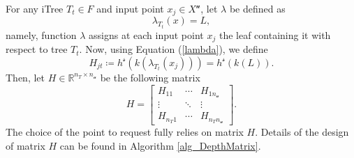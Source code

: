 For any iTree $T_t \in F$ and input point $x_j \in X^\mathcal{u}$, let $\lambda$ be defined as
\begin{equation}
    \lambda_{T_t}(x) = L, \label{lambda}
\end{equation}
namely, function $\lambda$ assigns at each input point $x_j$ the leaf containing it with respect to tree $T_t$. Now, using Equation (\ref{lambda}), we define
\[H_{jt}\coloneqq h^\mathcal{s}(k(\lambda_{T_t}(x_j))) = h^\mathcal{s}(k(L)).\] 
Then, let $H \in \mathbb{R}^{n_T \times n_\mathcal{u}}$ be the following matrix 
\begin{equation*}
H = 
\begin{bmatrix}
H_{11} & \cdots & H_{1n_\mathcal{u}}\\
\vdots  &  \ddots & \vdots  \\
H_{n_T 1} & \cdots & H_{n_T n_\mathcal{u}}
\end{bmatrix}.
\end{equation*}
The choice of the point to request fully relies on matrix $H$.  
Details of the design of matrix $H$ can be found in Algorithm \ref{alg_DepthMatrix}.

